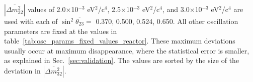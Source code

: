 \begin{table}
{  $|\overline{\Delta m^2_{32}}|$ values of
  2.0$\times$10$^{-3}$ eV$^{2}$/c$^{4}$,
  2.5$\times$10$^{-3}$ eV$^{2}$/c$^{4}$, and
  3.0$\times$10$^{-3}$ eV$^{2}$/c$^{4}$
  are used with each of
  $\sin^2\overline{\theta_{23}} = $ 
  0.370, 0.500, 0.524, 0.650.
  All other oscillation parameters are fixed at the values in table~\ref{tab:osc_params_fixed_values_reactor}.
  These maximum deviations usually occur at maximum disappearance, where the statistical error is smaller, as explained in
  Sec.~\ref{sec:validation}. The values are sorted by the size of the deviation in $|\overline{\Delta m^2_{32}}|$.
}
\label{tab:star_summary_by_mass}
\end{table}
